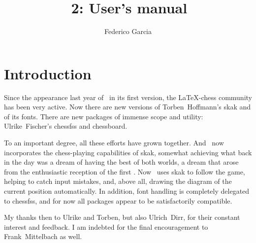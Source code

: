 \documentclass[12pt]{ltxdoc}
\begin{document}
\setcounter{IndexColumns}{2}
\renewcommand\usage{}
\title{\TeXmate\,2: User's manual}
\author{Federico Garcia}
\maketitle
\tableofcontents
\MakeShortVerb{\"}
\DeleteShortVerb{\|}
\makeatletter
\DeclareRobustCommand\SMC{%
  \ifx\@currsize\normalsize\small\else
   \ifx\@currsize\small\footnotesize\else
    \ifx\@currsize\footnotesize\scriptsize\else
     \ifx\@currsize\large\normalsize\else
      \ifx\@currsize\Large\large\else
       \ifx\@currsize\LARGE\Large\else
        \ifx\@currsize\scriptsize\tiny\else
         \ifx\@currsize\tiny\tiny\else
          \ifx\@currsize\huge\LARGE\else
           \ifx\@currsize\Huge\huge\else
            \small\SMC@unknown@warning
 \fi\fi\fi\fi\fi\fi\fi\fi\fi\fi
}
\newcommand\SMC@unknown@warning{\PackageWarning{\acro}{\string\SMC: unrecognised
    text font size command -- using \string\small}}
\newcommand\textSMC[1]{{\SMC #1}}
\newcommand\acro[1]{\textSMC{#1}\@}

\section{Introduction}

Since the appearance last year of \TeXmate\ in its  first version, the \LaTeX-chess community has been very active. Now there are new versions of Torben~Hoffmann's \textsf{skak} and of its fonts. There are new packages of immense scope and utility: Ulrike~Fischer's \textsf{chessfss} and \textsf{chessboard}. 

To an important degree, all these efforts have grown together. And \TeXmate\ now incorporates the chess-playing capabilities of \textsf{skak}, somewhat achieving what back in the day was a dream of having the best of both worlds, a dream that arose from the enthusiastic reception of the first \TeXmate. Now \TeXmate\ uses \textsf{skak} to follow the game, helping to catch input mistakes, and, above all, drawing the diagram of the current position automatically. In addition, font handling is completely delegated to \textsf{chessfss}, and for now all packages appear to be satisfactorily compatible.

My thanks then to Ulrike and Torben, but also Ulrich~Dirr, for their constant interest and feedback. I am indebted for the final encouragement to Frank~Mittelbach as well.
\end{document}
